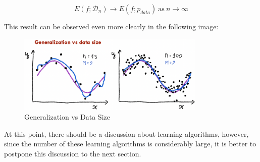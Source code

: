 \begin{equation*}
      E(f; \mathcal{D}_n) \rightarrow
      E(f; p_{data}) \ \text{as} \ n \rightarrow \infty
\end{equation*}

\vspace{3mm}

This result can be observed even more clearly in the following image:

\begin{figure}[h]
      \centering
      \includegraphics[width=0.8\textwidth]{../img/Generalization_vs_data_size}
      \caption{Generalization vs Data Size}
\end{figure}

At this point, there should be a discussion about learning algorithms,
however, since the number of these learning algorithms is considerably
large, it is better to postpone this discussion to the next section.
